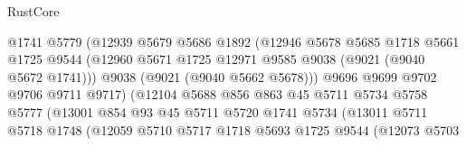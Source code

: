 \begin{lexlean}{RustCore}
\begin{coremodule}
                                  @1741
                                  @5779
                                  (@12939
                                    @5679
                                    @5686
                                    @1892
                                    (@12946
                                      @5678
                                      @5685
                                      @1718
                                      @5661
                                      @1725
                                      @9544
                                      (@12960
                                        @5671
                                        @1725
                                        @12971
                                        @9585
                                        @9038
                                        (@9021 (@9040 @5672 @1741)))
                                      @9038
                                      (@9021 (@9040 @5662 @5678)))
                                    @9696
                                    @9699
                                    @9702
                                    @9706
                                    @9711
                                    @9717)
                                  (@12104
                                    @5688
                                    @856
                                    @863
                                    @45
                                    @5711
                                    @5734
                                    @5758
                                    @5777
                                    (@13001
                                      @854
                                      @93
                                      @45
                                      @5711
                                      @5720
                                      @1741
                                      @5734
                                      (@13011
                                        @5711
                                        @5718
                                        @1748
                                        (@12059
                                          @5710
                                          @5717
                                          @1718
                                          @5693
                                          @1725
                                          @9544
                                          (@12073
                                            @5703

\end{coremodule}
\end{lexlean}
